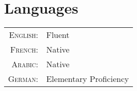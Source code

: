 \documentclass[a4paper,10pt]{article}
\begin{document}
\vspace{3mm}
\section{Languages}

\begin{tabular}{rl}
\textsc{English:}	& Fluent					\\
\textsc{French:}	& Native	\\
\textsc{Arabic:}	& Native    \\
\textsc{German:}	& Elementary Proficiency		\\
\end{tabular}
\end{document}
